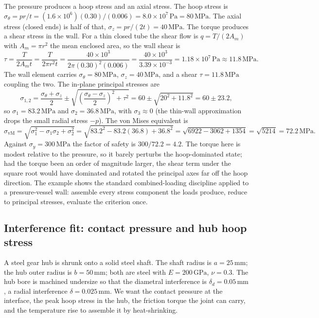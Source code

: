 The pressure produces a hoop stress and an axial stress. The hoop
stress is $\sigma_{\theta} = pr/t = (1.6\times 10^6)(0.30)/(0.006) =
8.0\times 10^7\,\text{Pa} = 80\,\text{MPa}$. The axial stress (closed
ends) is half of that, $\sigma_z = pr/(2t) = 40\,\text{MPa}$. The
torque produces a shear stress in the wall. For a thin closed tube the
shear flow is $q = T/(2A_m)$ with $A_m = \pi r^2$ the mean enclosed
area, so the wall shear is
\[
\tau = \frac{T}{2 A_m t} = \frac{T}{2\pi r^2 t} = \frac{40\times 10^3}
{2\pi (0.30)^2 (0.006)} = \frac{40\times 10^3}{3.39\times 10^{-3}} =
1.18\times 10^7\,\text{Pa} \approx 11.8\,\text{MPa}.
\]
The wall element carries $\sigma_{\theta} = 80\,\text{MPa}$,
$\sigma_z = 40\,\text{MPa}$, and a shear $\tau = 11.8\,\text{MPa}$
coupling the two. The in-plane principal stresses are
\[
\sigma_{1,2} = \frac{\sigma_{\theta} + \sigma_z}{2} \pm \sqrt{\left(
\frac{\sigma_{\theta} - \sigma_z}{2}\right)^2 + \tau^2} = 60 \pm
\sqrt{20^2 + 11.8^2} = 60 \pm 23.2,
\]
so $\sigma_1 = 83.2\,\text{MPa}$ and $\sigma_2 = 36.8\,\text{MPa}$,
with $\sigma_3 \approx 0$ (the thin-wall approximation drops the small
radial stress $-p$). The von Mises equivalent is
\[
\sigma_{\text{vM}} = \sqrt{\sigma_1^2 - \sigma_1\sigma_2 + \sigma_2^2}
= \sqrt{83.2^2 - 83.2(36.8) + 36.8^2} = \sqrt{6922 - 3062 + 1354} =
\sqrt{5214} = 72.2\,\text{MPa}.
\]
Against $\sigma_y = 300\,\text{MPa}$ the factor of safety is $300/72.2
= 4.2$. The torque here is modest relative to the pressure, so it
barely perturbs the hoop-dominated state; had the torque been an order
of magnitude larger, the shear term under the square root would have
dominated and rotated the principal axes far off the hoop direction.
The example shows the standard combined-loading discipline applied to a
pressure-vessel wall: assemble every stress component the loads
produce, reduce to principal stresses, evaluate the criterion once.

\subsection{Interference fit: contact pressure and hub hoop stress}

A steel gear hub is shrunk onto a solid steel shaft. The shaft radius is
$a = 25\,\si{\milli\meter}$; the hub outer radius is $b = 50\,\si{\milli
\meter}$; both are steel with $E = 200\,\text{GPa}$, $\nu = 0.3$. The hub
bore is machined undersize so that the diametral interference is
$\delta_d = 0.05\,\si{\milli\meter}$, a radial interference $\delta =
0.025\,\si{\milli\meter}$. We want the contact pressure at the interface,
the peak hoop stress in the hub, the friction torque the joint can carry,
and the temperature rise to assemble it by heat-shrinking.

